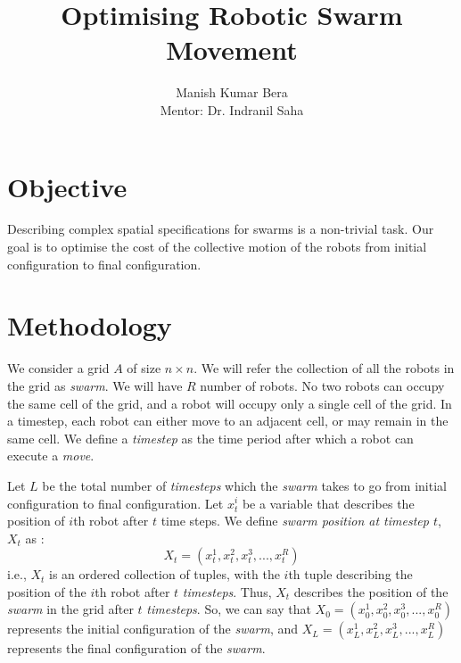 \documentclass{article}[11pt]
\title{Optimising Robotic Swarm Movement}
\author{Manish Kumar Bera \\
Mentor: Dr. Indranil Saha
}
\begin{document}
	\maketitle

	\section{Objective}
		Describing  complex  spatial  specifications  for  swarms  is a  non-trivial  task.
		Our goal is to optimise the cost of the collective motion of the robots from initial configuration to final configuration.

	\section{Methodology}
		We consider a grid $A$ of size $n \times n$.
		We will refer the collection of all the robots in the grid as \textit{swarm}. 
		We will have $R$ number of robots.%
		No two robots can occupy the same cell of the grid, and a robot will occupy only a single cell of the grid.
		In a timestep, each robot can either move to an adjacent cell, or may remain in the same cell.
		We define a \textit{timestep} as the time period after which a robot can execute a \textit{move}.

		Let $L$ be the total number of \textit{timesteps} which the \textit{swarm} takes to go from initial configuration to final configuration.  
		Let $x_t^i$ be a variable that describes the position of $i$th robot after $t$ time steps.
		We define \textit{swarm position at timestep $t$}, $X_t$ as :
		$$
			X_t = (x_t^1, x_t^2, x_t^3, . . . , x_t^R)
		$$
		i.e., $X_t$ is an ordered collection of tuples, with the $i$th tuple describing the position of the $i$th robot after $t$ \textit{timesteps}.
		Thus, $X_t$ describes the position of the \textit{swarm} in the grid after $t$ \textit{timesteps}. So, we can say that $X_0 =(x_0^1, x_0^2, x_0^3, . . . , x_0^R)$ represents the initial configuration of the \textit{swarm}, and $X_L = (x_L^1, x_L^2, x_L^3, . . . , x_L^R)$ represents the final configuration of the \textit{swarm}.
\end{document}
